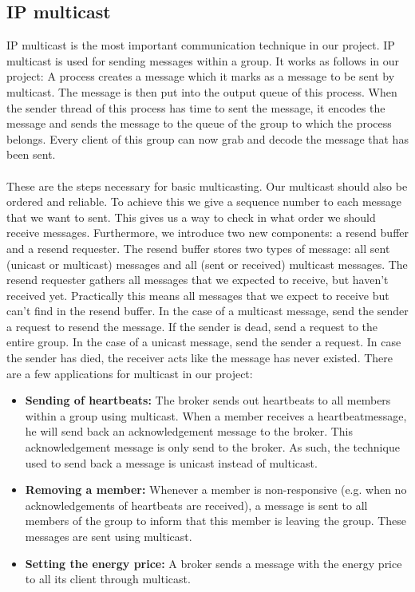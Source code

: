 \documentclass[10pt]{article} %
\begin{document}
\subsection{IP multicast}
IP multicast is the most important communication technique in our project. IP multicast is used for sending messages within a group. It works as follows in our project: A process creates a message which it marks as a message to be sent by multicast. The message is then put into the output queue of this process. When the sender thread of this process has time to sent the message, it encodes the message and sends the message to the queue of the group to which the process belongs. Every client of this group can now grab and decode the message that has been sent.\\
\\
These are the steps necessary for basic multicasting. Our multicast should also be ordered and reliable. To achieve this we give a sequence number to each message that we want to sent. This gives us a way to check in what order we should receive messages. Furthermore, we introduce two new components: a resend buffer and a resend requester. The resend buffer stores two types of message: all sent (unicast or multicast) messages and all (sent or received) multicast messages. The resend requester gathers all messages that we expected to receive, but haven't received yet. Practically this means all messages that we expect to receive but can't find in the resend buffer. In the case of a multicast message, send the sender a request to resend the message. If the sender is dead, send a request to the entire group. In the case of a unicast message, send the sender a request. In case the sender has died, the receiver acts like the message has never existed. There are a few applications for multicast in our project:
\begin{itemize}
 \item \textbf{Sending of heartbeats:} The broker sends out heartbeats to all members within a group using multicast. When a member receives a heartbeatmessage, he will send back an acknowledgement message to the broker. This acknowledgement message is only send to the broker. As such, the technique used  to send back a message is unicast instead of multicast.\\
 \item \textbf{Removing a member:} Whenever a member is non-responsive (e.g. when no acknowledgements of heartbeats are received), a message is sent to all members of the group to inform that this member is leaving the group. These messages are sent using multicast.\\
 \item \textbf{Setting the energy price:} A broker sends a message with the energy price to all its client through multicast.\\
\end{itemize}
\end{document}
